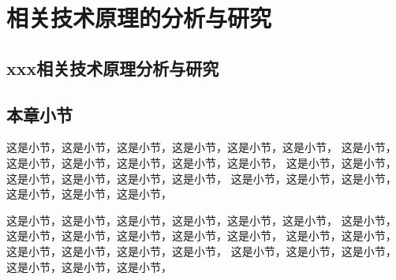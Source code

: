 \chapter {相关技术原理的分析与研究}


\section {xxx相关技术原理分析与研究}


\section {本章小节}


这是小节，这是小节，这是小节，这是小节，这是小节，这是小节，
这是小节，这是小节，这是小节，这是小节，这是小节，这是小节，
这是小节，这是小节，这是小节，这是小节，这是小节，这是小节，
这是小节，这是小节，这是小节，这是小节，这是小节，这是小节，

这是小节，这是小节，这是小节，这是小节，这是小节，这是小节，
这是小节，这是小节，这是小节，这是小节，这是小节，这是小节，
这是小节，这是小节，这是小节，这是小节，这是小节，这是小节，
这是小节，这是小节，这是小节，这是小节，这是小节，这是小节，

\clearpage %
